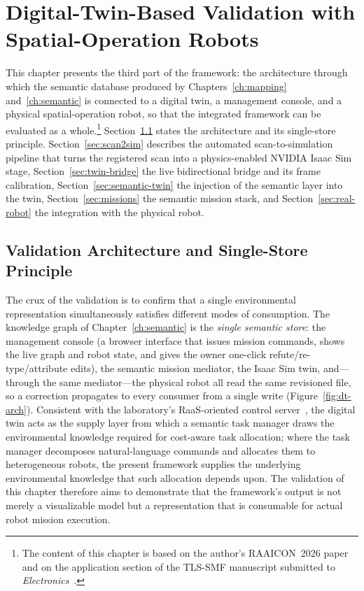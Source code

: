 \chapter{Digital-Twin-Based Validation with Spatial-Operation Robots}
\label{ch:validation}
This chapter presents the third part of the framework: the architecture
through which the semantic database produced by Chapters~\ref{ch:mapping}
and~\ref{ch:semantic} is connected to a digital twin, a management console, and
a physical spatial-operation robot, so that the integrated framework can be
evaluated as a whole.\footnote{The content of this chapter is based on the author's RAAICON~2026 paper~\cite{raaicon2026} and on the application section of the TLS-SMF manuscript submitted to \emph{Electronics}~\cite{kim2026electronics}.} Section~\ref{sec:dt-arch} states the architecture and
its single-store principle. Section~\ref{sec:scan2sim} describes the automated
scan-to-simulation pipeline that turns the registered scan into a
physics-enabled NVIDIA Isaac Sim stage, Section~\ref{sec:twin-bridge} the live
bidirectional bridge and its frame calibration, Section~\ref{sec:semantic-twin}
the injection of the semantic layer into the twin, Section~\ref{sec:missions}
the semantic mission stack, and Section~\ref{sec:real-robot} the integration
with the physical robot.

\section{Validation Architecture and Single-Store Principle}
\label{sec:dt-arch}

The crux of the validation is to confirm that a single environmental
representation simultaneously satisfies different modes of consumption. The
knowledge graph of Chapter~\ref{ch:semantic} is the \emph{single semantic
store}: the management console (a browser interface that issues mission
commands, shows the live graph and robot state, and gives the owner one-click
refute/re-type/attribute edits), the semantic mission mediator, the Isaac Sim
twin, and---through the same mediator---the physical robot all read the same
revisioned file, so a correction propagates to every consumer from a single
write (Figure~\ref{fig:dt-arch}). Consistent with the laboratory's
RaaS-oriented control server~\cite{kwon2025}, the digital twin acts as the
supply layer from which a semantic task manager draws the environmental
knowledge required for cost-aware task allocation; where the task manager
decomposes natural-language commands and allocates them to heterogeneous
robots, the present framework supplies the underlying environmental knowledge
that such allocation depends upon. The validation of this chapter therefore
aims to demonstrate that the framework's output is not merely a visualizable
model but a representation that is consumable for actual robot mission
execution.

